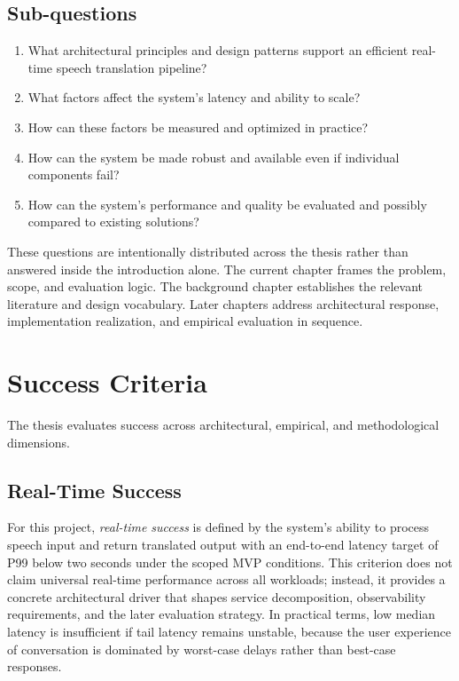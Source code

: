 \subsection{Sub-questions}

\begin{enumerate}
\item What architectural principles and design patterns support an efficient real-time speech translation pipeline?
\item What factors affect the system's latency and ability to scale?
\item How can these factors be measured and optimized in practice?
\item How can the system be made robust and available even if individual components fail?
\item How can the system's performance and quality be evaluated and possibly compared to existing solutions?
\end{enumerate}

These questions are intentionally distributed across the thesis rather than answered inside the introduction alone. The current chapter frames the problem, scope, and evaluation logic. The background chapter establishes the relevant literature and design vocabulary. Later chapters address architectural response, implementation realization, and empirical evaluation in sequence.


\section{Success Criteria}
\label{sec:succes-criteria}

The thesis evaluates success across architectural, empirical, and methodological dimensions.

\subsection{Real-Time Success}

For this project, \emph{real-time success} is defined by the system's ability to process speech input and return translated output with an end-to-end latency target of P99 below two seconds under the scoped MVP conditions. This criterion does not claim universal real-time performance across all workloads; instead, it provides a concrete architectural driver that shapes service decomposition, observability requirements, and the later evaluation strategy. In practical terms, low median latency is insufficient if tail latency remains unstable, because the user experience of conversation is dominated by worst-case delays rather than best-case responses.

